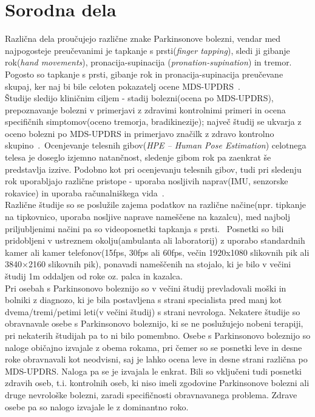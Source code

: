 \documentclass[a4paper,12pt]{article}
\begin{document}
\section{Sorodna dela}

Različna dela proučujejo različne znake Parkinsonove bolezni, vendar med najpogosteje preučevanimi je 
tapkanje s prsti(\textit{finger tapping}), sledi ji gibanje rok(\textit{hand movements}), pronacija-supinacija 
(\textit{pronation-supination}) in tremor. Pogosto so tapkanje s prsti, gibanje rok in pronacija-supinacija 
preučevane skupaj, ker naj bi bile celoten pokazatelj ocene MDS-UPDRS~\cite{Manzanera}. \\

Študije sledijo kliničnim ciljem - stadij bolezni(ocena po MDS-UPDRS), prepoznavanje bolezni v primerjavi z 
zdravimi kontrolnimi primeri in ocena specifičnih simptomov(oceno tremorja, bradikinezije); največ študij 
se ukvarja z oceno bolezni po MDS-UPDRS in primerjavo značilk z zdravo kontrolno skupino~\cite{Amo-Salas}.\
Ocenjevanje telesnih gibov(\textit{HPE – Human Pose Estimation}) celotnega telesa je doseglo izjemno natančnost, 
sledenje gibom rok pa zaenkrat še predstavlja izzive. Podobno kot pri ocenjevanju telesnih gibov, tudi pri 
sledenju rok uporabljajo različne pristope - uporaba nosljivih naprav(IMU, senzorske rokavice) in uporaba 
računalniškega vida~\cite{Amprimoa}. \\


Različne študije so se poslužile zajema podatkov na različne načine(npr. tipkanje na tipkovnico, uporaba 
nosljive naprave nameščene na kazalcu), med najbolj priljubljenimi načini pa so videoposnetki tapkanja s prsti. \
Posnetki so bili pridobljeni v ustreznem okolju(ambulanta ali laboratorij) z uporabo standardnih kamer ali 
kamer telefonov(15fps, 30fps ali 60fps, večin 1920x1080 slikovnih pik ali 3840$\times$2160 slikovnih pik), 
ponavadi nameščenih na stojalo, ki je bilo v večini študij 1m oddaljen od roke oz. palca in kazalca.\\

Pri osebah s Parkinsonovo boleznijo so v večini študij prevladovali moški in bolniki z diagnozo, ki je bila 
postavljena s strani specialista pred manj kot dvema/tremi/petimi leti(v večini študij) s strani nevrologa. 
Nekatere študije so obravnavale osebe s Parkinsonovo boleznijo, ki se ne poslužujejo nobeni terapiji, pri 
nekaterih študijah pa to ni bilo pomembno. Osebe s Parkinsonovo boleznijo so naloge običajno izvajale z 
obema rokama, pri čemer so se posnetki leve in desne roke obravnavali kot neodvisni, saj je lahko ocena 
leve in desne strani različna po MDS-UPDRS. Naloga pa se je izvajala le enkrat. Bili so vključeni tudi 
posnetki zdravih oseb, t.i. kontrolnih oseb, ki niso imeli zgodovine Parkinsonove bolezni ali druge 
nevrološke bolezni, zaradi specifičnosti obravnavanega problema. Zdrave osebe pa so nalogo izvajale le z 
dominantno roko. \\
\end{document}
